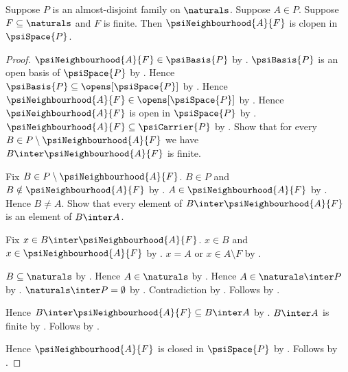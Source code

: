 \begin{theorem}\label{psi_neighbourhood_clopen}
    Suppose $P$ is an almost-disjoint family on $\naturals$.
    Suppose $A\in P$.
    Suppose $F\subseteq\naturals$ and $F$ is finite.
    Then $\psiNeighbourhood{A}{F}$ is clopen in $\psiSpace{P}$.
\end{theorem}
\begin{proof}
    $\psiNeighbourhood{A}{F}\in\psiBasis{P}$
        by .
    $\psiBasis{P}$ is an open basis of $\psiSpace{P}$
        by .
    Hence $\psiBasis{P}\subseteq\opens[\psiSpace{P}]$
        by .
    Hence $\psiNeighbourhood{A}{F}\in\opens[\psiSpace{P}]$
        by .
    Hence $\psiNeighbourhood{A}{F}$ is open in $\psiSpace{P}$
        by .
    $\psiNeighbourhood{A}{F}\subseteq\psiCarrier{P}$
        by .
    Show that for every $B\in P\setminus\psiNeighbourhood{A}{F}$
        we have $B\inter\psiNeighbourhood{A}{F}$ is finite.
    \begin{subproof}
        Fix $B\in P\setminus\psiNeighbourhood{A}{F}$.
        $B\in P$ and $B\notin\psiNeighbourhood{A}{F}$ by .
        $A\in\psiNeighbourhood{A}{F}$
            by .
        Hence $B\neq A$.
        Show that every element of $B\inter\psiNeighbourhood{A}{F}$
            is an element of $B\inter A$.
        \begin{subproof}
            Fix $x\in B\inter\psiNeighbourhood{A}{F}$.
            $x\in B$ and $x\in\psiNeighbourhood{A}{F}$ by .
            $x=A$ or $x\in A\setminus F$
                by .
            \begin{byCase}
                    $B\subseteq\naturals$ by
                        .
                    Hence $A\in\naturals$ by .
                    Hence $A\in\naturals\inter P$ by .
                    $\naturals\inter P=\emptyset$ by
                        .
                    Contradiction by .
                    Follows by .
            \end{byCase}
        \end{subproof}
        Hence $B\inter\psiNeighbourhood{A}{F}\subseteq B\inter A$
            by .
        $B\inter A$ is finite by
            .
        Follows by .
    \end{subproof}
    Hence $\psiNeighbourhood{A}{F}$ is closed in $\psiSpace{P}$
        by .
    Follows by .
\end{proof}

